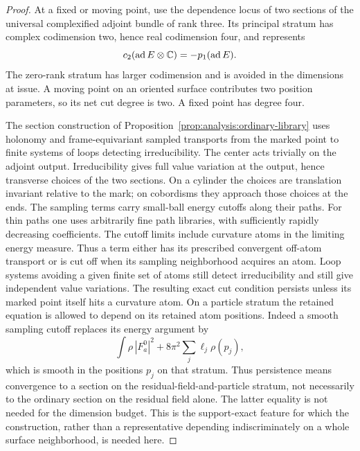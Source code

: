 \begin{proof}
At a fixed or moving point, use the dependence locus of two sections of
the universal complexified adjoint bundle of rank three.  Its principal
stratum has complex codimension two, hence real codimension four, and
represents
\[
                     c_2(\operatorname{ad} E\otimes\mathbb C)=-p_1(\operatorname{ad} E).
\]
The zero-rank stratum has larger codimension and is avoided in the
dimensions at issue.  A moving point on an oriented surface contributes
two position parameters, so its net cut degree is two.  A fixed point
has degree four.

The section construction of Proposition~\ref{prop:analysis:ordinary-library}
uses holonomy and frame-equivariant sampled transports from the marked
point to finite systems of loops detecting irreducibility.  The center
acts trivially on the adjoint output.  Irreducibility gives full value
variation at the output, hence transverse choices of the two sections.
On a cylinder the choices are translation invariant relative to the
mark; on cobordisms they approach those choices at the ends.  The
sampling terms carry small-ball energy cutoffs along their paths.
For thin paths one uses arbitrarily fine path libraries, with sufficiently
rapidly decreasing coefficients.  The cutoff limits include curvature
atoms in the limiting energy measure.  Thus a term either has its
prescribed convergent off-atom transport or is cut off when its sampling
neighborhood acquires an atom.  Loop systems avoiding a given finite
set of atoms still detect irreducibility and still give independent
value variations.  The resulting exact cut condition persists unless
its marked point itself hits a curvature atom.  On a particle stratum
the retained equation is allowed to depend on its retained atom
positions.  Indeed a smooth sampling cutoff replaces its energy
argument by
\[
 \int\rho\,|F_a^0|^2+8\pi^2\sum_j\ell_j\rho(p_j),
\]
which is smooth in the positions $p_j$ on that stratum.  Thus persistence
means convergence to a section on the residual-field-and-particle
stratum, not necessarily to the ordinary section on the residual field
alone.  The latter equality is not needed for the dimension budget.
This is the
support-exact feature for which the construction, rather than a
representative depending indiscriminately on a whole surface
neighborhood, is needed here.


\end{proof}
